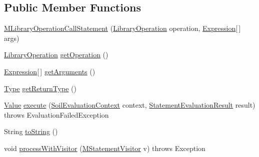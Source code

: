 \subsection*{Public Member Functions}
\begin{DoxyCompactItemize}
\item 
\hyperlink{classorg_1_1tzi_1_1use_1_1uml_1_1sys_1_1soil_1_1_m_library_operation_call_statement_a2b6e9fbd8f6b00ed19c79ba72c4e3ec8}{M\-Library\-Operation\-Call\-Statement} (\hyperlink{interfaceorg_1_1tzi_1_1use_1_1uml_1_1sys_1_1soil_1_1library_1_1_library_operation}{Library\-Operation} operation, \hyperlink{classorg_1_1tzi_1_1use_1_1uml_1_1ocl_1_1expr_1_1_expression}{Expression}\mbox{[}$\,$\mbox{]} args)
\item 
\hyperlink{interfaceorg_1_1tzi_1_1use_1_1uml_1_1sys_1_1soil_1_1library_1_1_library_operation}{Library\-Operation} \hyperlink{classorg_1_1tzi_1_1use_1_1uml_1_1sys_1_1soil_1_1_m_library_operation_call_statement_a41c6c4881576039bf17e7242dd3fdef4}{get\-Operation} ()
\item 
\hyperlink{classorg_1_1tzi_1_1use_1_1uml_1_1ocl_1_1expr_1_1_expression}{Expression}\mbox{[}$\,$\mbox{]} \hyperlink{classorg_1_1tzi_1_1use_1_1uml_1_1sys_1_1soil_1_1_m_library_operation_call_statement_a3654d9cb9887de632126a0dab9462f83}{get\-Arguments} ()
\item 
\hyperlink{interfaceorg_1_1tzi_1_1use_1_1uml_1_1ocl_1_1type_1_1_type}{Type} \hyperlink{classorg_1_1tzi_1_1use_1_1uml_1_1sys_1_1soil_1_1_m_library_operation_call_statement_a80109cea82c8f029a7f2e4a607088241}{get\-Return\-Type} ()
\item 
\hyperlink{classorg_1_1tzi_1_1use_1_1uml_1_1ocl_1_1value_1_1_value}{Value} \hyperlink{classorg_1_1tzi_1_1use_1_1uml_1_1sys_1_1soil_1_1_m_library_operation_call_statement_a3cfb0a303e43676d2577ad39eb0b062c}{execute} (\hyperlink{classorg_1_1tzi_1_1use_1_1uml_1_1sys_1_1soil_1_1_soil_evaluation_context}{Soil\-Evaluation\-Context} context, \hyperlink{classorg_1_1tzi_1_1use_1_1uml_1_1sys_1_1_statement_evaluation_result}{Statement\-Evaluation\-Result} result)  throws Evaluation\-Failed\-Exception 
\item 
String \hyperlink{classorg_1_1tzi_1_1use_1_1uml_1_1sys_1_1soil_1_1_m_library_operation_call_statement_a48ca334ac8a2be4d77dac68e9fc31d42}{to\-String} ()
\item 
void \hyperlink{classorg_1_1tzi_1_1use_1_1uml_1_1sys_1_1soil_1_1_m_library_operation_call_statement_ad3799e7faed5b66f9c4a7ec2ca685f35}{process\-With\-Visitor} (\hyperlink{interfaceorg_1_1tzi_1_1use_1_1uml_1_1sys_1_1soil_1_1_m_statement_visitor}{M\-Statement\-Visitor} v)  throws Exception 
\end{DoxyCompactItemize}
